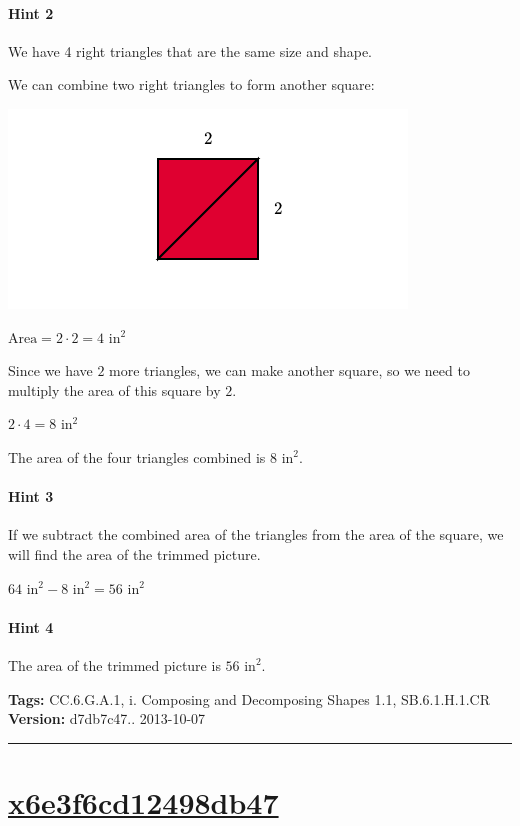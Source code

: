 \documentclass[twocolumn,10pt]{article}
\def\shrinkfactor{0.55}
\begin{document}
\paragraph{Hint 2}We have 4 right triangles that are the same size and shape.  

We can combine two right triangles to form another square: 


\includegraphics[scale=\shrinkfactor]{figures/8990031770cbd0af85eeed620a6be4bcc4e04b7b.png}      

${\text{Area}}=2\cdot2=4\text{ in}^2$  

Since we have $2$ more triangles, we can make another square, so we need to multiply the area of this square by $2$.  

$2\cdot4=8\text{ in}^2$

The area of the four triangles combined is $8\text{ in}^2$.

\paragraph{Hint 3}If we subtract the combined area of the triangles from the area of the square, we will find the area of the trimmed picture.  

$64\text{ in}^2-8\text{ in}^2=56\text{ in}^2$

\paragraph{Hint 4}The area of the trimmed picture is $56\text{ in}^2$.



\medskip
\noindent
\textbf{Tags:} {\footnotesize CC.6.G.A.1, i.	Composing and Decomposing Shapes 1.1, SB.6.1.H.1.CR}\\
\textbf{Version:} d7db7c47.. 2013-10-07
\smallskip\hrule





\section{\href{https://www.khanacademy.org/devadmin/content/items/x6e3f6cd12498db47}{x6e3f6cd12498db47}}
\end{document}
